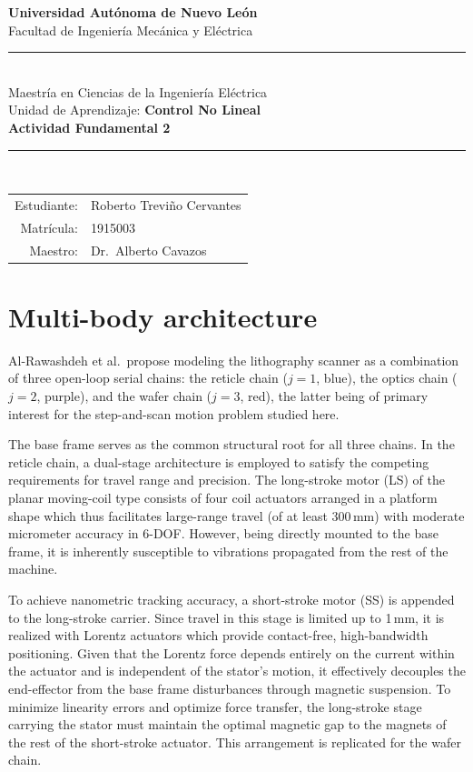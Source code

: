 \documentclass[11pt,letterpaper]{article}
\begin{document}
\thispagestyle{empty}
\begin{center}
  {\bfseries Universidad Autónoma de Nuevo León}\\
  Facultad de Ingeniería Mecánica y Eléctrica\\[0.6em]
  \textcolor{uanlBlue}{\rule{\linewidth}{1pt}}\\[0.6em]
  Maestría en Ciencias de la Ingeniería Eléctrica\\
  Unidad de Aprendizaje: \textbf{Control No Lineal}\\[1.2em]
  {\LARGE\bfseries Actividad Fundamental 2}\\[1em]
  \textcolor{uanlBlue}{\rule{0.6\linewidth}{0.4pt}}\\[1em]
  \begin{tabular}{rl}
    Estudiante: & Roberto Treviño Cervantes \\
    Matrícula:  & 1915003 \\
    Maestro:    & Dr.\ Alberto Cavazos \\
  \end{tabular}
\end{center}

\vfill
\newpage
\setcounter{page}{1}


\section*{Multi-body architecture}

Al-Rawashdeh et al.\ propose modeling the lithography scanner as a combination of three open-loop serial chains: the reticle chain ($j=1$, blue), the optics chain ($j=2$, purple), and the wafer chain ($j=3$, red), the latter being of primary interest for the step-and-scan motion problem studied here.

The base frame serves as the common structural root for all three chains. In the reticle chain, a dual-stage architecture is employed to satisfy the competing requirements for travel range and precision. The long-stroke motor (LS) of the planar moving-coil type consists of four coil actuators arranged in a platform shape which thus facilitates large-range travel (of at least 300\,mm) with moderate micrometer accuracy in 6-DOF. However, being directly mounted to the base frame, it is inherently susceptible to vibrations propagated from the rest of the machine.

To achieve nanometric tracking accuracy, a short-stroke motor (SS) is appended to the long-stroke carrier. Since travel in this stage is limited up to 1\,mm, it is realized with Lorentz actuators which provide contact-free, high-bandwidth positioning. Given that the Lorentz force depends entirely on the current within the actuator and is independent of the stator's motion, it effectively decouples the end-effector from the base frame disturbances through magnetic suspension. To minimize linearity errors and optimize force transfer, the long-stroke stage carrying the stator must maintain the optimal magnetic gap to the magnets of the rest of the short-stroke actuator. This arrangement is replicated for the wafer chain.
\end{document}
